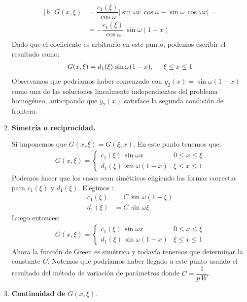 \begin{ejemplo}
\begin{enumerate}
\begin{align}
\begin{aligned}[b]
G (x, \xi) &= \dfrac{c_{1} (\xi)}{\cos \omega} \big[ \sin \omega x \, \cos \omega - \sin \omega \, \cos \omega x \big] = \\[0.5em]
&= - \dfrac{c_{1} (\xi)}{\cos \omega} \, \sin \omega (1 - x)
\end{aligned}
\label{eq:ecuaction_07_38}
\end{align}
Dado que el coeficiente es arbitrario en este punto, podemos escribir el resultado como:
\begin{align*}
G (x, \xi) = d_{1} (\xi) \, \sin \omega (1 - x), \hspace{0.5cm} \xi \leq x \leq 1
\end{align*}
Observamos que podríamos haber comenzado con $y_{2} (x) = \sin \omega (1 - x)$ como una de las soluciones linealmente independientes del problema homogéneo, anticipando que $y_{2} (x)$ satisface la segunda condición de frontera.
\item \textbf{Simetría o reciprocidad.}
\par
\noindent
Si imponemos que $G (x, \xi) = G (\xi, x)$. En este punto tenemos que:
\begin{align*}
G (x, \xi) = \begin{cases}
c_{1} (\xi) \, \sin \omega x & 0 \leq x \leq \xi \\[0.5em]
d_{1} (\xi) \, \sin \omega (1 - x) & \xi \leq x \leq 1
\end{cases}
\end{align*}
Podemos hacer que los casos sean simétricos eligiendo las formas correctas para $c_{1} (\xi)$ y $d_{1} (\xi)$. Elegimos :
\begin{align*}
c_{1} (\xi) &= C \, \sin \omega (1 - \xi) \\[0.5em]
d_{1} (\xi) &= C \, \sin \omega \xi
\end{align*}
Luego entonces:
\begin{align*}
G (x, \xi) = \begin{cases}
c_{1} (\xi) \, \sin \omega x & 0 \leq x \leq \xi \\[0.5em]
d_{1} (\xi) \, \sin \omega (1 - x) & \xi \leq x \leq 1
\end{cases}
\end{align*}
Ahora la función de Green es simétrica y todavía tenemos que determinar la constante $C$. Notemos que podríamos haber llegado a este punto usando el resultado del método de variación de parámetros donde $C = \dfrac{1}{p \, W}$.
\item \textbf{Continuidad de $G (x, \xi)$}.

\end{enumerate}
\end{ejemplo}
